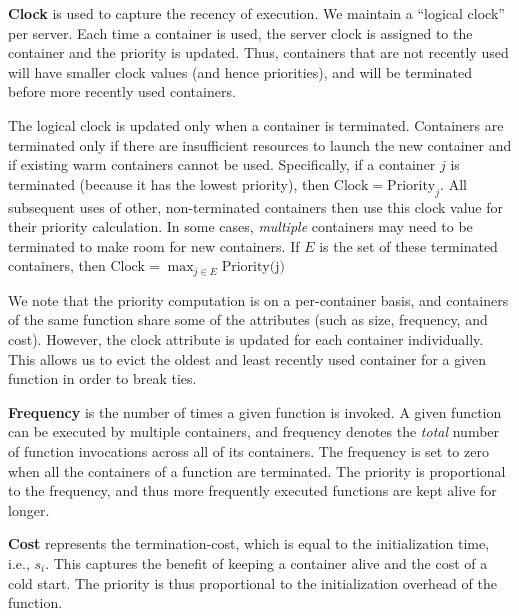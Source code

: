 \noindent \textbf{Clock} is used to capture the recency of execution.
%
We maintain a ``logical clock'' per server.
%
Each time a container is used, the server clock is assigned to the container and the priority is updated. 
%
Thus, containers that are not recently used will have smaller clock values (and hence priorities), and will be terminated before more recently used containers. 

The logical clock is updated only when a container is terminated. 
Containers are terminated only if there are insufficient resources to launch the new container and if existing warm containers cannot be used.  
%
Specifically, if a container  $j$ is terminated (because it has the lowest priority), then $\text{Clock} = \text{Priority}_j$.
All subsequent uses of other, non-terminated containers then use this clock value for their priority calculation.
%
In some cases, \emph{multiple} containers may need to be terminated to make room for new containers.
%
If $E$ is the set of these terminated containers, then $\text{Clock} = \max_{j \in E}{\text{Priority(j)}}$

We note that the priority computation is on a per-container basis, and containers of the same function share some of the attributes (such as size, frequency, and cost). 
However, the clock attribute is updated for each container individually.
This allows us to evict the oldest and least recently used container for a given function in order to break ties. 



\noindent \textbf{Frequency} is the number of times a given function is invoked.
%
A given function can be executed by multiple containers, and frequency denotes the \emph{total} number of function invocations across all of its containers. 
%
The frequency is set to zero when all the containers of a function are terminated.
%
The priority is proportional to the frequency, and thus more frequently executed functions are kept alive for longer. 
%
%


\noindent \textbf{Cost} represents the termination-cost, which is equal to the initialization time, i.e., $s_i$. 
%
This captures the benefit of keeping a container alive and the cost of a cold start. 
%
The priority is thus proportional to the initialization overhead of the function. 





